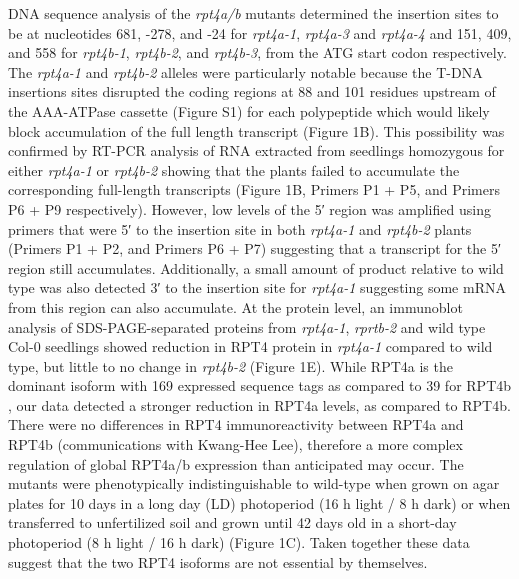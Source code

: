 DNA sequence analysis of the \textit{rpt4a/b} mutants determined the insertion sites to be at nucleotides 681, -278, and -24 for \textit{rpt4a-1}, \textit{rpt4a-3} and \textit{rpt4a-4} and 151, 409, and 558 for \textit{rpt4b-1}, \textit{rpt4b-2}, and \textit{rpt4b-3}, from the ATG start codon respectively. The \textit{rpt4a-1} and \textit{rpt4b-2} alleles were particularly notable because the T-DNA insertions sites disrupted the coding regions at 88 and 101 residues upstream of the AAA-ATPase cassette (Figure S1) for each polypeptide which would likely block accumulation of the full length transcript (Figure 1B). This possibility was confirmed by RT-PCR analysis of RNA extracted from seedlings homozygous for either \textit{rpt4a-1} or \textit{rpt4b-2} showing that the plants failed to accumulate the corresponding full-length transcripts (Figure 1B, Primers P1 + P5, and Primers P6 + P9 respectively). However, low levels of the 5′ region was amplified using primers that were 5′ to the insertion site in both \textit{rpt4a-1} and \textit{rpt4b-2} plants (Primers P1 + P2, and Primers P6 + P7) suggesting that  a transcript for the 5′ region still accumulates. Additionally, a small amount of product relative to wild type was also detected 3′ to the insertion site for \textit{rpt4a-1} suggesting some mRNA from this region can also accumulate. At the protein level, an immunoblot analysis of SDS-PAGE-separated proteins from \textit{rpt4a-1}, \textit{rprtb-2} and wild type Col-0 seedlings showed reduction in RPT4 protein in \textit{rpt4a-1} compared to wild type, but little to no change in \textit{rpt4b-2} (Figure 1E). While RPT4a is the dominant isoform with 169 expressed sequence tags as compared to 39 for RPT4b \citep{berardini15}, our data detected a stronger reduction in RPT4a levels, as compared to RPT4b. There were no differences in RPT4 immunoreactivity between RPT4a and RPT4b (communications with Kwang-Hee Lee), therefore a more complex regulation of global RPT4a/b expression than anticipated may occur.  The mutants were phenotypically indistinguishable to wild-type when grown on agar plates for 10 days in a long day (LD) photoperiod (16 h light / 8 h dark) or when transferred to unfertilized soil and grown until 42 days old in a short-day photoperiod (8 h light / 16 h dark) (Figure 1C).  Taken together these data suggest that the two RPT4 isoforms are not essential by themselves.
